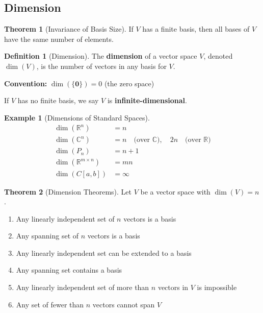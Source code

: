 \documentclass[12pt,a4paper]{article}
\theoremstyle{definition}
\newtheorem{definition}{Definition}[section]
\newtheorem{theorem}{Theorem}[section]
\newtheorem{example}{Example}[section]
\begin{document}
\subsection{Dimension}

\begin{theorem}[Invariance of Basis Size]
If $V$ has a finite basis, then all bases of $V$ have the same number of elements.
\end{theorem}

\begin{definition}[Dimension]
The \textbf{dimension} of a vector space $V$, denoted $\dim(V)$, is the number of vectors in any basis for $V$.

\textbf{Convention:} $\dim(\{\mathbf{0}\}) = 0$ (the zero space)

If $V$ has no finite basis, we say $V$ is \textbf{infinite-dimensional}.
\end{definition}

\begin{example}[Dimensions of Standard Spaces]
\begin{align}
\dim(\mathbb{R}^n) &= n \\
\dim(\mathbb{C}^n) &= n \quad \text{(over $\mathbb{C}$)}, \quad 2n \quad \text{(over $\mathbb{R}$)} \\
\dim(P_n) &= n + 1 \\
\dim(\mathbb{R}^{m \times n}) &= mn \\
\dim(C[a,b]) &= \infty
\end{align}
\end{example}

\begin{theorem}[Dimension Theorems]
Let $V$ be a vector space with $\dim(V) = n$.

\begin{enumerate}
    \item Any linearly independent set of $n$ vectors is a basis
    
    \item Any spanning set of $n$ vectors is a basis
    
    \item Any linearly independent set can be extended to a basis
    
    \item Any spanning set contains a basis
    
    \item Any linearly independent set of more than $n$ vectors in $V$ is impossible
    
    \item Any set of fewer than $n$ vectors cannot span $V$
\end{enumerate}
\end{theorem}
\end{document}
